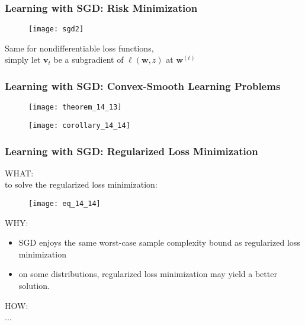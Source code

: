 \begin{frame}
\frametitle{Learning with SGD: Risk Minimization}

\begin{figure}
    \centering
    \texttt{[image: sgd2]}
\end{figure}

Same for nondifferentiable loss functions,\\
simply let $\mathbf{v}_t$ be a subgradient of $\ell(\mathbf{w}, z)$ at $\mathbf{w}^{(t)}$

\end{frame}

\begin{frame}
\frametitle{Learning with SGD: Convex-Smooth Learning Problems}

\begin{figure}
    \centering
    \texttt{[image: theorem\_14\_13]}
\end{figure}

\begin{figure}
    \centering
    \texttt{[image: corollary\_14\_14]}
\end{figure}

\end{frame}

\begin{frame}
\frametitle{Learning with SGD: Regularized Loss Minimization}

WHAT:\\
to solve the regularized loss minimization:
\begin{figure}
    \centering
    \texttt{[image: eq\_14\_14]}
\end{figure}

WHY:\\
\begin{itemize}
\item SGD enjoys the same worst-case sample complexity bound as regularized loss minimization
\item on some distributions, regularized loss minimization may yield a better solution.
\end{itemize}

HOW:\\
...
\end{frame}

